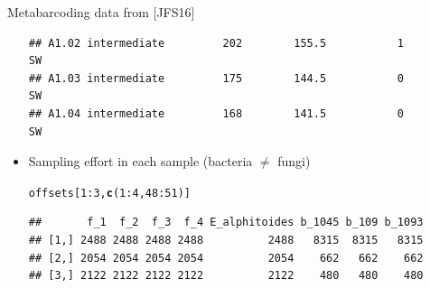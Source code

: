 \documentclass[10pt, c, xcolor=x11names]{beamer}\usepackage[]{graphicx}\usepackage[]{color}
\makeatletter
\newcommand{\hlnum}[1]{\textcolor[rgb]{0.686,0.059,0.569}{#1}}%
\newcommand{\hlopt}[1]{\textcolor[rgb]{0,0,0}{#1}}%
\newcommand{\hlstd}[1]{\textcolor[rgb]{0.345,0.345,0.345}{#1}}%
\newcommand{\hlkwd}[1]{\textcolor[rgb]{0.737,0.353,0.396}{\textbf{#1}}}%
\newenvironment{kframe}{%
 \def\at@end@of@kframe{}%
 \ifinner\ifhmode%
  \def\at@end@of@kframe{\end{minipage}}%
  \begin{minipage}{\columnwidth}%
 \fi\fi%
 \def\FrameCommand##1{\hskip\@totalleftmargin \hskip-\fboxsep
 \colorbox{shadecolor}{##1}\hskip-\fboxsep
     \hskip-\linewidth \hskip-\@totalleftmargin \hskip\columnwidth}%
 \MakeFramed {\advance\hsize-\width
   \@totalleftmargin\z@ \linewidth\hsize
   \@setminipage}}%
 {\par\unskip\endMakeFramed%
 \at@end@of@kframe}
\newenvironment{knitrout}{}{} %
\makeatother
\begin{document}
\begin{frame}[fragile]
\begin{block}{Metabarcoding data from [JFS16]}
\begin{itemize}
\begin{knitrout}
\begin{kframe}
\begin{verbatim}
## A1.02 intermediate         202        155.5           1          SW
## A1.03 intermediate         175        144.5           0          SW
## A1.04 intermediate         168        141.5           0          SW
\end{verbatim}
\end{kframe}
\end{knitrout}
    \item Sampling effort in each sample (bacteria $\neq$  fungi)
\begin{knitrout}\scriptsize
{}\color{fgcolor}\begin{kframe}
\begin{alltt}
\hlstd{offsets[}\hlnum{1}\hlopt{:}\hlnum{3}\hlstd{,} \hlkwd{c}\hlstd{(}\hlnum{1}\hlopt{:}\hlnum{4}\hlstd{,} \hlnum{48}\hlopt{:}\hlnum{51}\hlstd{)]}
\end{alltt}
\begin{verbatim}
##       f_1  f_2  f_3  f_4 E_alphitoides b_1045 b_109 b_1093
## [1,] 2488 2488 2488 2488          2488   8315  8315   8315
## [2,] 2054 2054 2054 2054          2054    662   662    662
## [3,] 2122 2122 2122 2122          2122    480   480    480
\end{verbatim}
\end{kframe}
\end{knitrout}
    \end{itemize}
  \end{block}

\end{frame}
\end{document}
